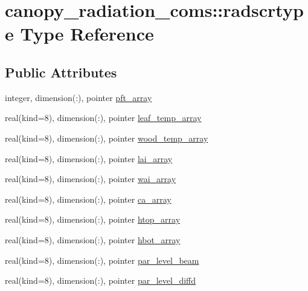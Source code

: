\hypertarget{structcanopy__radiation__coms_1_1radscrtype}{}\section{canopy\+\_\+radiation\+\_\+coms\+:\+:radscrtype Type Reference}
\label{structcanopy__radiation__coms_1_1radscrtype}
\subsection*{Public Attributes}
\begin{DoxyCompactItemize}
\item 
integer, dimension(\+:), pointer \hyperlink{structcanopy__radiation__coms_1_1radscrtype_a966ed19724c2ef7b66af65ef3a56eb8f}{pft\+\_\+array}
\item 
real(kind=8), dimension(\+:), pointer \hyperlink{structcanopy__radiation__coms_1_1radscrtype_a57fbfde7080d6a9328c073d3a5eb26f3}{leaf\+\_\+temp\+\_\+array}
\item 
real(kind=8), dimension(\+:), pointer \hyperlink{structcanopy__radiation__coms_1_1radscrtype_ab2c191fb2e19839b8465587f40b5329a}{wood\+\_\+temp\+\_\+array}
\item 
real(kind=8), dimension(\+:), pointer \hyperlink{structcanopy__radiation__coms_1_1radscrtype_a1adbdda331989c4f70935ecc458bd958}{lai\+\_\+array}
\item 
real(kind=8), dimension(\+:), pointer \hyperlink{structcanopy__radiation__coms_1_1radscrtype_ac153a4fd9eb5dd14f9b2b77de6ea9a7e}{wai\+\_\+array}
\item 
real(kind=8), dimension(\+:), pointer \hyperlink{structcanopy__radiation__coms_1_1radscrtype_ad10035b255c3530ce731137cccc69d16}{ca\+\_\+array}
\item 
real(kind=8), dimension(\+:), pointer \hyperlink{structcanopy__radiation__coms_1_1radscrtype_a9a7dccee420039db4918efd6cf056e81}{htop\+\_\+array}
\item 
real(kind=8), dimension(\+:), pointer \hyperlink{structcanopy__radiation__coms_1_1radscrtype_a9ec5d7fc42af7484e57c312101189e6d}{hbot\+\_\+array}
\item 
real(kind=8), dimension(\+:), pointer \hyperlink{structcanopy__radiation__coms_1_1radscrtype_a7d1fc8813bbf0f42a09b1d147106d749}{par\+\_\+level\+\_\+beam}
\item 
real(kind=8), dimension(\+:), pointer \hyperlink{structcanopy__radiation__coms_1_1radscrtype_aed02746f748dfbbfcb92ab166de738db}{par\+\_\+level\+\_\+diffd}

\end{DoxyCompactItemize}

